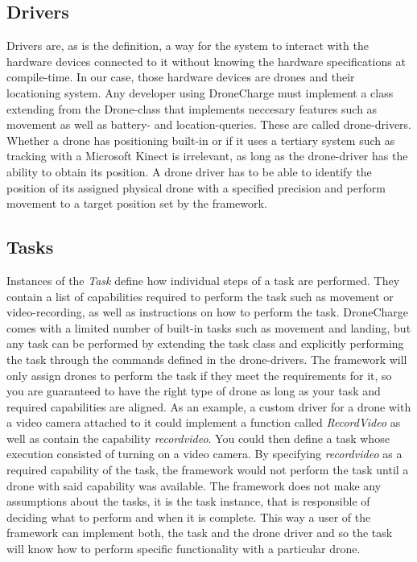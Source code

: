 \subsection{Drivers}
Drivers are, as is the definition, a way for the system to interact with the hardware devices connected to it without knowing the hardware specifications at compile-time. In our case, those hardware devices are drones and their locationing system. Any developer using DroneCharge must implement a class extending from the Drone-class that implements neccesary features such as movement as well as battery- and location-queries. These are called drone-drivers. Whether a drone has positioning built-in or if it uses a tertiary system such as tracking with a Microsoft Kinect is irrelevant, as long as the drone-driver has the ability to obtain its position. A drone driver has to be able to identify the position of its assigned physical drone with a specified precision and perform movement to a target position set by the framework.

\subsection{Tasks}
Instances of the \textit{Task} define how individual steps of a task are performed. They contain a list of capabilities required to perform the task such as movement or video-recording, as well as instructions on how to perform the task. DroneCharge comes with a limited number of built-in tasks such as movement and landing, but any task can be performed by extending the task class and explicitly performing the task through the commands defined in the drone-drivers. The framework will only assign drones to perform the task if they meet the requirements for it, so you are guaranteed to have the right type of drone as long as your task and required capabilities are aligned. As an example, a custom driver for a drone with a video camera attached to it could implement a function called \textit{RecordVideo} as well as contain the capability \textit{recordvideo}. You could then define a task whose execution consisted of turning on a video camera. By specifying \textit{recordvideo} as a required capability of the task, the framework would not perform the task until a drone with said capability was available. The framework does not make any assumptions about the tasks, it is the task instance, that is responsible of deciding what to perform and when it is complete. This way a user of the framework can implement both, the task and the drone driver and so the task will know how to perform specific functionality with a particular drone.

